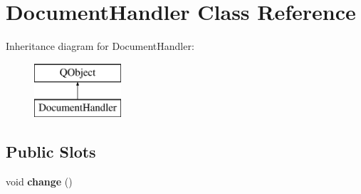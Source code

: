 \hypertarget{classDocumentHandler}{}\section{Document\+Handler Class Reference}
\label{classDocumentHandler}
Inheritance diagram for Document\+Handler\+:\begin{figure}[H]
\begin{center}
\leavevmode
\includegraphics[height=2.000000cm]{classDocumentHandler}
\end{center}
\end{figure}
\subsection*{Public Slots}
\begin{DoxyCompactItemize}
\item 
\mbox{\label{classDocumentHandler_a0ecd6f194d033839ad435774a9e69175}} 
void {\bfseries change} ()
\end{DoxyCompactItemize}
